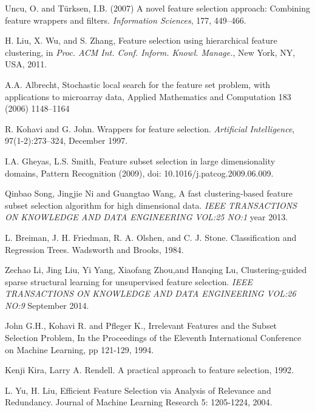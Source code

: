 \documentclass[a4paper,11pt]{article}
\begin{document}

\begin{thebibliography}{}

Uncu, O. and T\"urksen, I.B. (2007) A novel feature selection
approach: Combining feature wrappers and filters. \textit{Information Sciences}, 177, 449--466.

H. Liu, X. Wu, and S. Zhang, Feature selection using hierarchical feature clustering, in \textit{Proc. ACM Int. Conf. Inform. Knowl. Manage.}, New York, NY, USA, 2011.

A.A. Albrecht, Stochastic local search for the feature set problem, with applications to microarray data, Applied Mathematics and Computation 183 (2006) 1148–1164

R. Kohavi and G. John. Wrappers for feature selection. \textit{Artificial Intelligence}, 97(1-2):273–324,
December 1997.

I.A. Gheyas, L.S. Smith, Feature subset selection in large dimensionality domains, Pattern Recognition (2009), doi:
10.1016/j.patcog.2009.06.009.

Qinbao Song, Jingjie Ni and Guangtao Wang, A fast clustering-based feature subset selection algorithm for high dimensional data. \textit{IEEE TRANSACTIONS ON KNOWLEDGE AND DATA ENGINEERING VOL:25 NO:1} year 2013.

L. Breiman, J. H. Friedman, R. A. Olshen, and C. J. Stone. Classification and Regression Trees. Wadsworth and Brooks, 1984.

Zechao Li, Jing Liu, Yi Yang, Xiaofang Zhou,and Hanqing Lu, Clustering-guided sparse structural learning
for unsupervised feature selection. \textit{IEEE TRANSACTIONS ON KNOWLEDGE AND DATA ENGINEERING VOL:26 NO:9} September 2014.

John G.H., Kohavi R. and Pfleger K., Irrelevant Features and the Subset Selection Problem, In the Proceedings of the Eleventh International Conference on Machine Learning, pp 121-129, 1994.

Kenji Kira, Larry A. Rendell. A practical approach to feature selection, 1992.

L. Yu, H. Liu, Efficient Feature Selection via Analysis
of Relevance and Redundancy. Journal of Machine
Learning Research 5: 1205-1224, 2004.


\end{thebibliography}
\end{document}
